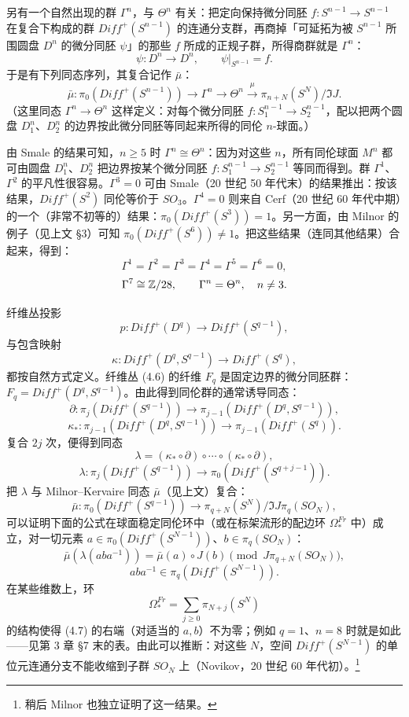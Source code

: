 另有一个自然出现的群 $\Gamma^n$，与 $\Theta^n$ 有关：把定向保持微分同胚 $f:S^{n-1}\to S^{n-1}$ 在复合下构成的群 $Diff^+(S^{n-1})$ 的连通分支群，再商掉「可延拓为被 $S^{n-1}$ 所围圆盘 $D^n$ 的微分同胚 $\psi$」的那些 $f$ 所成的正规子群，所得商群就是 $\Gamma^n$：
\[
\psi:D^n\to D^n,\qquad \psi|_{S^{n-1}}=f.
\]
于是有下列同态序列，其复合记作 $\bar\mu$：
\[
\bar\mu:\pi_0(Diff^+(S^{n-1}))\longrightarrow\Gamma^n\longrightarrow\Theta^n\overset{\mu}{\longrightarrow}\pi_{n+N}(S^N)/\Im J.
\]
（这里同态 $\Gamma^n\to\Theta^n$ 这样定义：对每个微分同胚 $f:S^{n-1}_1\to S^{n-1}_2$，配以把两个圆盘 $D^n_1$、$D^n_2$ 的边界按此微分同胚等同起来所得的同伦 $n$-球面。）

由 Smale 的结果可知，$n\ge5$ 时 $\Gamma^n\cong\Theta^n$：因为对这些 $n$，所有同伦球面 $M^n$ 都可由圆盘 $D^n_1$、$D^n_2$ 把边界按某个微分同胚 $f:S^{n-1}_1\to S^{n-1}_2$ 等同而得到。群 $\Gamma^1$、$\Gamma^2$ 的平凡性很容易。$\Gamma^3=0$ 可由 Smale（20 世纪 50 年代末）的结果推出：按该结果，$Diff^+(S^2)$ 同伦等价于 $SO_3$。$\Gamma^4=0$ 则来自 Cerf（20 世纪 60 年代中期）的一个（非常不初等的）结果：$\pi_0(Diff^+(S^3))=1$。另一方面，由 Milnor 的例子（见上文 §3）可知 $\pi_0(Diff^+(S^6))\ne1$。把这些结果（连同其他结果）合起来，得到：
\[
\Gamma^1=\Gamma^2=\Gamma^3=\Gamma^4=\Gamma^5=\Gamma^6=0,
\]
\[
\Gamma^7\cong\mathbb{Z}/28,\qquad \Gamma^n=\Theta^n,\quad n\ne3.
\]

纤维丛投影
\begin{equation}
p:Diff^+(D^q)\longrightarrow Diff^+(S^{q-1}), \tag{4.6}
\end{equation}
与包含映射
\[
\kappa:Diff^+(D^q,S^{q-1})\longrightarrow Diff^+(S^q),
\]
都按自然方式定义。纤维丛 (4.6) 的纤维 $F_q$ 是固定边界的微分同胚群：$F_q=Diff^+(D^q,S^{q-1})$。由此得到同伦群的通常诱导同态：
\[
\partial:\pi_j(Diff^+(S^{q-1}))\longrightarrow\pi_{j-1}(Diff^+(D^q,S^{q-1})),
\]
\[
\kappa_*:\pi_{j-1}(Diff^+(D^q,S^{q-1}))\longrightarrow\pi_{j-1}(Diff^+(S^q)).
\]
复合 $2j$ 次，便得到同态
\[
\lambda=(\kappa_*\circ\partial)\circ\cdots\circ(\kappa_*\circ\partial),
\]
\[
\lambda:\pi_j(Diff^+(S^{q-1}))\longrightarrow\pi_0(Diff^+(S^{q+j-1})).
\]
把 $\lambda$ 与 Milnor--Kervaire 同态 $\bar\mu$（见上文）复合：
\[
\bar\mu:\pi_0(Diff^+(S^{q-1}))\longrightarrow\pi_{q+N}(S^N)/\Im J\pi_q(SO_N),
\]
可以证明下面的公式在球面稳定同伦环中（或在标架流形的配边环 $\Omega^{Fr}_*$ 中）成立，对一切元素 $a\in\pi_0(Diff^+(S^{N-1}))$、$b\in\pi_q(SO_N)$：
\begin{equation}
\bar\mu(\lambda(aba^{-1}))=\bar\mu(a)\circ J(b)\pmod{J\pi_{q+N}(SO_N)}, \tag{4.7}
\end{equation}
\[
aba^{-1}\in\pi_q(Diff^+(S^{N-1})).
\]
在某些维数上，环
\[
\Omega^{Fr}_*=\sum_{j\ge0}\pi_{N+j}(S^N)
\]
的结构使得 (4.7) 的右端（对适当的 $a,b$）不为零；例如 $q=1$、$n=8$ 时就是如此——见第 3 章 §7 末的表。由此可以推断：对这些 $N$，空间 $Diff^+(S^{N-1})$ 的单位元连通分支不能收缩到子群 $SO_N$ 上（Novikov，20 世纪 60 年代初）。\footnote{稍后 Milnor 也独立证明了这一结果。}

